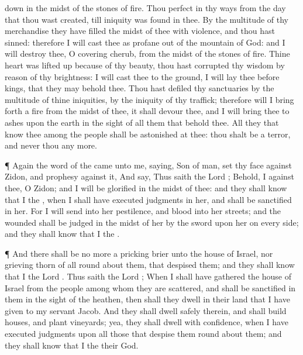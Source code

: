 {down in the
midst of the
stones of
fire.
Thou
{}
perfect in thy
ways from the
day that thou wast
created, till
iniquity was
found in thee.
By the
multitude of thy
merchandise they have
filled the
midst of thee with
violence, and thou hast
sinned: therefore I will cast thee as
profane out of the
mountain of
God: and I will
destroy thee, O
covering
cherub, from the
midst of the
stones of
fire.
Thine
heart was lifted
up because of thy
beauty, thou hast
corrupted thy
wisdom by reason
of thy
brightness: I will
cast thee to the
ground, I will
lay thee
before
kings, that they may
behold thee.
Thou hast
defiled thy
sanctuaries by the
multitude of thine
iniquities, by the
iniquity of thy
traffick; therefore will I bring
forth a
fire from the
midst of thee, it shall
devour thee, and I will
bring thee to
ashes upon the
earth in the
sight of all them that
behold thee.
All they that
know thee among the
people shall be
astonished at thee: thou shalt be a
terror, and
never
{} thou
{} any
more.
\par }{\PP {}¶ Again the
word of the
{} came unto me,
saying,
Son of
man,
set thy
face against
Zidon, and
prophesy against it,
And
say, Thus
saith the
Lord
{}; Behold, I
{} against thee, O
Zidon; and I will be
glorified in the
midst of thee: and they shall
know that I
{} the
{}, when I shall have
executed
judgments in her, and shall be
sanctified in her.
For I will
send into her
pestilence, and
blood into her
streets; and the
wounded shall be
judged in the
midst of her by the
sword upon her on every
side; and they shall
know that I
{} the
{}.
\par }{\PP {}¶ And there shall be no more a
pricking
brier unto the
house of
Israel, nor
{}
grieving
thorn of all
{} round
about them, that
despised them; and they shall
know that I
{} the
Lord
{}.
Thus
saith the
Lord
{}; When I shall have
gathered the
house of
Israel from the
people among whom they are
scattered, and shall be
sanctified in them in the
sight of the
heathen, then shall they
dwell in their
land that I have
given to my
servant
Jacob.
And they shall
dwell
safely therein, and shall
build
houses, and
plant
vineyards; yea, they shall
dwell with
confidence, when I have
executed
judgments upon all those that
despise them round
about them; and they shall
know that I
{} the
{} their
God.

}
